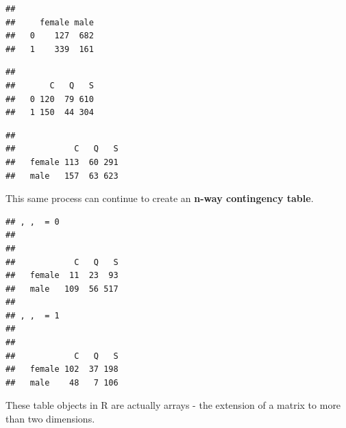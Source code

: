 \documentclass[
]{book}
\newenvironment{Shaded}{\begin{snugshade}}{\end{snugshade}}
\newcommand{\KeywordTok}[1]{\textcolor[rgb]{0.13,0.29,0.53}{\textbf{#1}}}
\newcommand{\NormalTok}[1]{#1}
\newcommand{\OperatorTok}[1]{\textcolor[rgb]{0.81,0.36,0.00}{\textbf{#1}}}
\newcommand{\StringTok}[1]{\textcolor[rgb]{0.31,0.60,0.02}{#1}}
\theoremstyle{definition}
\theoremstyle{definition}
\theoremstyle{definition}
\theoremstyle{remark}
\begin{document}
\begin{verbatim}
##    
##     female male
##   0    127  682
##   1    339  161
\end{verbatim}

\begin{Shaded}
\end{Shaded}

\begin{verbatim}
##    
##       C   Q   S
##   0 120  79 610
##   1 150  44 304
\end{verbatim}

\begin{Shaded}
\end{Shaded}

\begin{verbatim}
##         
##            C   Q   S
##   female 113  60 291
##   male   157  63 623
\end{verbatim}

This same process can continue to create an \textbf{n-way contingency table}.

\begin{Shaded}
\end{Shaded}

\begin{verbatim}
## , ,  = 0
## 
##         
##            C   Q   S
##   female  11  23  93
##   male   109  56 517
## 
## , ,  = 1
## 
##         
##            C   Q   S
##   female 102  37 198
##   male    48   7 106
\end{verbatim}

These table objects in R are actually arrays - the extension of a matrix to more than two dimensions.

\begin{Shaded}
\end{Shaded}
\end{document}
